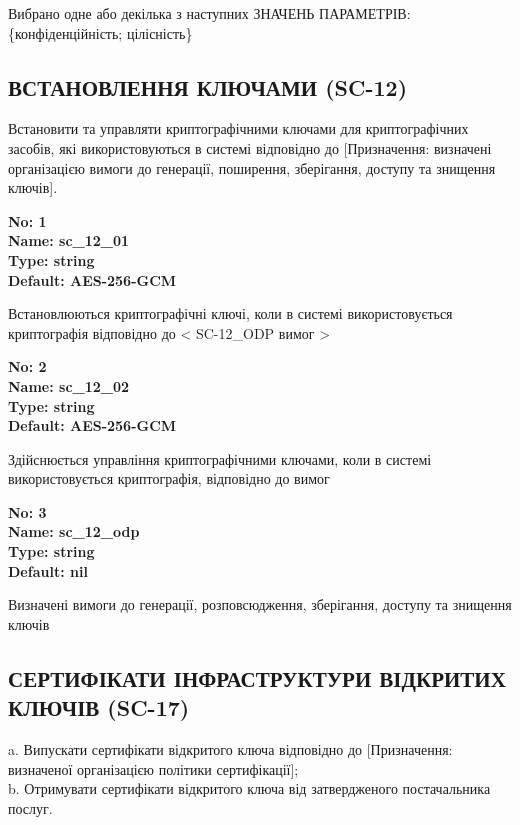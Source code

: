 \documentclass{article}
\begin{document}
{\footnotesize Вибрано одне або декілька з наступних ЗНАЧЕНЬ ПАРАМЕТРІВ: \{конфіденційність; цілісність\}}




\subsection{ВСТАНОВЛЕННЯ КЛЮЧАМИ (SC-12)}
Встановити та управляти криптографічними ключами для криптографічних засобів, які використовуються в системі відповідно до [Призначення: визначені організацією вимоги до генерації, поширення, зберігання, доступу та знищення ключів].

\vspace{10pt}
{\footnotesize\bfseries
No: 1\\
Name: sc\_\allowbreak{}12\_\allowbreak{}01\\
Type: string\\
Default: \textquotedbl{}AES-256-GCM\textquotedbl{}
}

{\footnotesize Встановлюються криптографічні ключі, коли в системі використовується криптографія відповідно до < SC-12\_\allowbreak{}ODP вимог >}


{\footnotesize\bfseries
No: 2\\
Name: sc\_\allowbreak{}12\_\allowbreak{}02\\
Type: string\\
Default: \textquotedbl{}AES-256-GCM\textquotedbl{}
}

{\footnotesize Здійснюється управління криптографічними ключами, коли в системі використовується криптографія, відповідно до вимог }


{\footnotesize\bfseries
No: 3\\
Name: sc\_\allowbreak{}12\_\allowbreak{}odp\\
Type: string\\
Default: nil
}

{\footnotesize Визначені вимоги до генерації, розповсюдження, зберігання, доступу та знищення ключів}




\subsection{СЕРТИФІКАТИ ІНФРАСТРУКТУРИ ВІДКРИТИХ КЛЮЧІВ (SC-17)}
a. Випускати сертифікати відкритого ключа відповідно до [Призначення: визначеної організацією політики сертифікації];\\ 
b. Отримувати сертифікати відкритого ключа від затвердженого постачальника послуг.
\end{document}
